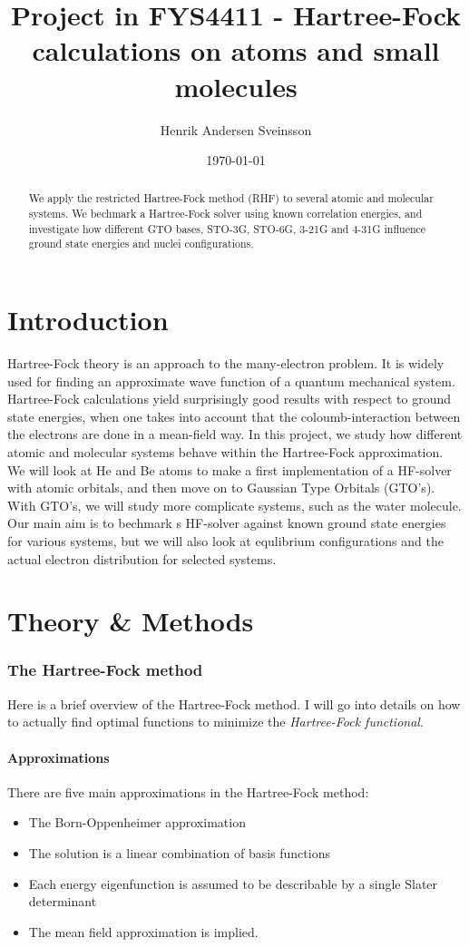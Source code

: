 \documentclass[a4paper,10pt, twocolumn, pre]{revtex4}
\begin{document}
\title{Project in FYS4411 - Hartree-Fock calculations on atoms and small molecules}
\author{Henrik Andersen Sveinsson}
\date{\today}

\begin{abstract}
We apply the restricted Hartree-Fock method (RHF) to several atomic and molecular systems. We bechmark a Hartree-Fock solver using known correlation energies, and investigate how different GTO bases, STO-3G, STO-6G, 3-21G and 4-31G influence ground state energies and nuclei configurations.
\end{abstract}
\maketitle


\part{Introduction}
Hartree-Fock theory is an approach to the many-electron problem. It is widely used for finding an approximate wave function of a quantum mechanical system. Hartree-Fock calculations yield surprisingly good results with respect to ground state energies, when one takes into account that the coloumb-interaction between the electrons are done in a mean-field way. In this project, we study how different atomic and molecular systems behave within the Hartree-Fock approximation. We will look at He and Be atoms to make a first implementation of a HF-solver with atomic orbitals, and then move on to Gaussian Type Orbitals (GTO's). With GTO's, we will study more complicate systems, such as the water molecule. Our main aim is to bechmark s HF-solver against known ground state energies for various systems, but we will also look at equlibrium configurations and the actual electron distribution for selected systems. 
\part{Theory \& Methods}
\section{The Hartree-Fock method}
Here is a brief overview of the Hartree-Fock method. I will go into details on how to actually find optimal functions to minimize the \emph{Hartree-Fock functional}. 
\subsection{Approximations}
There are five main approximations in the Hartree-Fock method:
\begin{itemize}
 \item The Born-Oppenheimer approximation
 \item The solution is a linear combination of basis functions
 \item Each energy eigenfunction is assumed to be describable by a single Slater determinant
 \item The mean field approximation is implied. 
\end{itemize}
\end{document}
